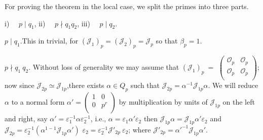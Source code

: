 For proving the theorem in the local case, we split the primes into
three parts. 

 i)~~  $ p \mid q_1 $,  \qquad ii)~~  $ p \nmid q_1 q_2 $, \qquad  
iii)~~   $ p \mid q_2 $.

\begin{case}[(i) ]\label{chap4:sec9:thm4:case1} %
  $ p \mid q_1$.\pageoriginale This in trivial, for $ ( \mathcal{J}_1 )_p = (
  \mathcal{J}_ 2)_p =  \mathcal{J}_p $ so that  $ \beta_p = 1 $. 
\end{case}

\begin{case}[(ii) ]\label{chap4:sec9:thm4:case2}
  $ p \nmid q_1 ~ q_2 $. Without loss of generality we may assume that
  $ ( \mathcal{J}_1 )_p ~ = $ $  \begin{pmatrix} \mathscr{O}_p &
    \mathscr{O}_p \\ \mathscr{O}_p & \mathscr{O}_p \\  \end{pmatrix}
  $; now since  $ \mathcal{J}_{2p} \simeq \mathcal{J}_{1p} $,there
  exists  $ \alpha \in  Q_p $ such that $ \mathcal{J}_{2p} =
  \alpha^{-1} \mathcal{J}_{1p} \alpha $. We will reduce  $ \alpha $
  to a normal form $ \alpha' =  \begin{pmatrix} 1 & 0 \\ 0 & p^r
    \\  \end{pmatrix} $ by multiplication by units of $
  \mathcal{J}_{1p} $ on the left and right, say $ \alpha' =
  \varepsilon^{-1}_1 \alpha \varepsilon^{-1}_{2} $,  i.e., $ \alpha
  = \varepsilon_1 \alpha' \varepsilon_2 $ then  $ \mathcal{J}_{1p}
  \alpha = \mathcal{J}_{1p} \alpha' \varepsilon_2 $ and $
  \mathcal{J}_{2p} = \varepsilon^{-1}_{2} ( \alpha^{1-1}
  \mathcal{J}_{1p} \alpha' ) $  $\varepsilon_2 = \varepsilon^{-1}_2
  \mathcal{J}'_{2p} ~ \varepsilon_2 $; where $ \mathcal{J}'_{2p} =
  \alpha'^{-1} \mathcal{J}_{1p} \alpha' $.  
\end{case}


